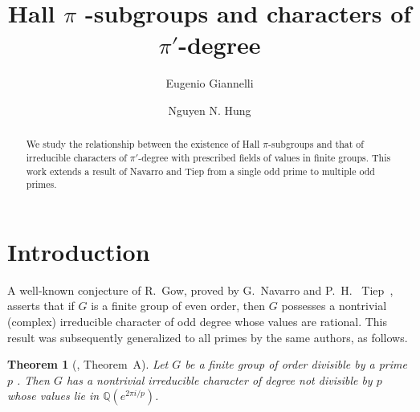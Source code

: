 \documentclass[12pt]{amsart}
\title[Hall $\pi$-subgroups and characters of $\pi'$-degree]{Hall $\pi$%
-subgroups and characters %
of $\pi'$-degree}
\author[Eugenio Giannelli]{Eugenio Giannelli}
\author[Nguyen N. Hung]{Nguyen N. Hung}
\newtheorem{theorem}{Theorem}[section]
\theoremstyle{definition}
\numberwithin{equation}{section}
\newcommand{\QQ}{{\mathbb Q}}
\begin{document}
\begin{abstract}
We study the relationship between the existence of Hall
$\pi$-subgroups and that of irreducible characters %
of $\pi'$-degree
with prescribed fields of values in finite groups. This work extends
a result of Navarro and Tiep %
from a single odd prime to multiple odd
primes.
\end{abstract}

\maketitle



\section{Introduction}

A well-known conjecture of R.~Gow, proved by G.~Navarro and
P.~H.~%
Tiep~\cite{Navarro-Tiep2}, asserts that if %
$G$ is %
a finite
group %
of even order, then $G$ possesses a nontrivial (complex)
irreducible character of odd degree whose values are rational. This
result was subsequently generalized to all primes by the same
authors, as follows.

\begin{theorem}[\cite{Navarro-Tiep1}, Theorem~A]\label{thm:Navarro-Tiep}
Let $G$ be a finite group of order divisible by a prime $p$%
. Then
$G$ %
has a nontrivial %
irreducible character of degree not divisible
by $p$ whose values lie %
in $\QQ(e^{2\pi i/p})$. %
\end{theorem}
\end{document}
